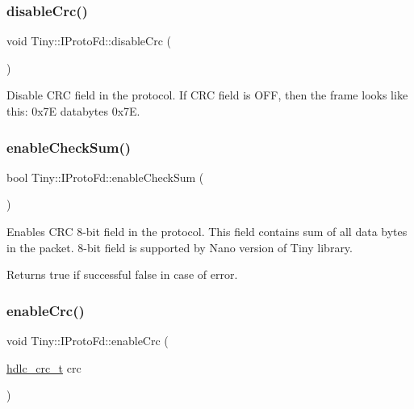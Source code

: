\subsubsection{\texorpdfstring{disable\+Crc()}{disableCrc()}}
{\footnotesize\ttfamily void Tiny\+::\+I\+Proto\+Fd\+::disable\+Crc (\begin{DoxyParamCaption}{ }\end{DoxyParamCaption})}

Disable C\+RC field in the protocol. If C\+RC field is O\+FF, then the frame looks like this\+: 0x7E databytes 0x7E. \mbox{\label{classTiny_1_1IProtoFd_a0f43402e86ea64f5c0154477d84b0c7c}} 
\subsubsection{\texorpdfstring{enable\+Check\+Sum()}{enableCheckSum()}}
{\footnotesize\ttfamily bool Tiny\+::\+I\+Proto\+Fd\+::enable\+Check\+Sum (\begin{DoxyParamCaption}{ }\end{DoxyParamCaption})}

Enables C\+RC 8-\/bit field in the protocol. This field contains sum of all data bytes in the packet. 8-\/bit field is supported by Nano version of Tiny library. \begin{DoxyReturn}{Returns}
true if successful false in case of error. 
\end{DoxyReturn}
\mbox{\label{classTiny_1_1IProtoFd_a7dec2906051505034e91b503318a5563}} 
\subsubsection{\texorpdfstring{enable\+Crc()}{enableCrc()}}
{\footnotesize\ttfamily void Tiny\+::\+I\+Proto\+Fd\+::enable\+Crc (\begin{DoxyParamCaption}\item[{\hyperlink{group__HDLC__API_gabb73b32d08d8e79eefe9385634a74bf7}{hdlc\+\_\+crc\+\_\+t}}]{crc }\end{DoxyParamCaption})}

